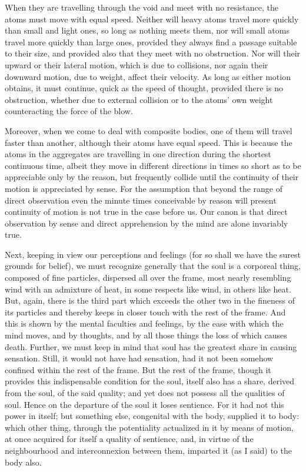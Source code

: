 \documentclass{stex}
\begin{document}
When they are travelling through the void and meet with no resistance, the atoms must move with equal speed.
Neither will heavy atoms travel more quickly than small and light ones, so long as nothing meets them, nor will small atoms travel more quickly than large ones, provided they always find a passage suitable to their size, and provided also that they meet with no obstruction.
Nor will their upward or their lateral motion, which is due to collisions, nor again their downward motion, due to weight, affect their velocity.
As long as either motion obtains, it must continue, quick as the speed of thought, provided there is no obstruction, whether due to external collision or to the atoms' own weight counteracting the force of the blow.

Moreover, when we come to deal with composite bodies, one of them will travel faster than another, although their atoms have equal speed.
This is because the atoms in the aggregates are travelling in one direction during the shortest continuous time, albeit they move in different directions in times so short as to be appreciable only by the reason, but frequently collide until the continuity of their motion is appreciated by sense.
For the assumption that beyond the range of direct observation even the minute times conceivable by reason will present continuity of motion is not true in the case before us.
Our canon is that direct observation by sense and direct apprehension by the mind are alone invariably true.

Next, keeping in view our perceptions and feelings (for so shall we have the surest grounds for belief), we must recognize generally that the soul is a corporeal thing, composed of fine particles, dispersed all over the frame, most nearly resembling wind with an admixture of heat, in some respects like wind, in others like heat.
But, again, there is the third part which exceeds the other two in the fineness of its particles and thereby keeps in closer touch with the rest of the frame.
And this is shown by the mental faculties and feelings, by the ease with which the mind moves, and by thoughts, and by all those things the loss of which causes death.
Further, we must keep in mind that soul has the greatest share in causing sensation.
Still, it would not have had sensation, had it not been somehow confined within the rest of the frame.
But the rest of the frame, though it provides this indispensable condition for the soul, itself also has a share, derived from the soul, of the said quality; and yet does not possess all the qualities of soul.
Hence on the departure of the soul it loses sentience.
For it had not this power in itself; but something else, congenital with the body, supplied it to body: which other thing, through the potentiality actualized in it by means of motion, at once acquired for itself a quality of sentience, and, in virtue of the neighbourhood and interconnexion between them, imparted it (as I said) to the body also.
\end{document}
